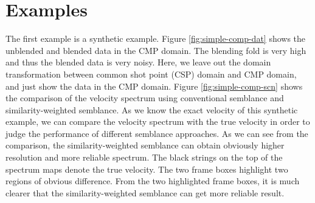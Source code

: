 \section{Examples}
The first example is a synthetic example. Figure \ref{fig:simple-comp-dat} shows the unblended and blended data in the CMP domain. The blending fold is very high and thus the blended data is very noisy.  Here, we leave out the domain transformation \cite[]{yangkang2014nmo} between common shot point (CSP) domain and CMP domain, and just show the data in the CMP domain. Figure \ref{fig:simple-comp-scn} shows the comparison of the velocity spectrum using conventional semblance and similarity-weighted semblance. As we know the exact velocity of this synthetic example, we can compare the velocity spectrum with the true velocity in order to judge the performance of different semblance approaches. As we can see from the comparison, the similarity-weighted semblance can obtain obviously higher resolution and more reliable spectrum. The black strings on the top of the spectrum maps denote the true velocity. The two frame boxes highlight two regions of obvious difference. From the two highlighted frame boxes, it is much clearer that the similarity-weighted semblance can get more reliable result.


